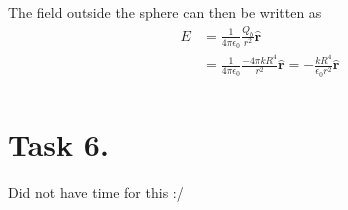 \documentclass[a4paper,11pt]{article}
\begin{document}
\begin{alphalist}
        The field outside the sphere can then be written as 
        \begin{align*}
            E &= \frac{1}{4\pi\epsilon_0}\frac{Q_b}{r^2} \mathbf{\hat{r}} \\
              &= \frac{1}{4\pi\epsilon_0}\frac{-4\pi k R^4}{r^2} \mathbf{\hat{r}} = -\frac{kR^4}{\epsilon_0 r^2}\mathbf{\hat{r}} \\
        \end{align*}

\end{alphalist}

\section*{Task 6.}
Did not have time for this :/
\end{document}
